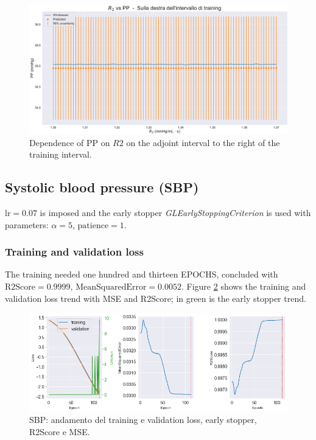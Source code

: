 \begin{figure}
    \centering
    \includegraphics[width=1\textwidth]{images/Training (risultati)/PP/PP - R2 - dx.pdf}
    \caption{Dependence of PP on $R2$ on the adjoint interval to the right of the training interval.}
    \label{PP - R2 - dx}
\end{figure}







\newpage

\subsection{Systolic blood pressure (SBP)}
$\text{lr}=0.07$ is imposed and the early stopper \textit{GLEarlyStoppingCriterion} is used with parameters: $\alpha = 5$, $\text{patience}=1$.

\subsubsection{Training and validation loss}
The training needed one hundred and thirteen EPOCHS, concluded with $\text{R2Score}=0.9999$, $\text{MeanSquaredError}=0.0052$. Figure \ref{SBP - loss} shows the training and validation loss trend with MSE and R2Score; in green is the early stopper trend.
\begin{figure}[h]
    \centering
    \includegraphics[width=1\textwidth]{images/Training (risultati)/SBP/SBP - loss.png}
    \caption{SBP: andamento del training e validation loss, early stopper, R2Score e MSE.}
    \label{SBP - loss}
\end{figure}

